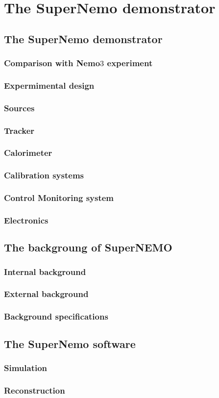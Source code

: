 \chapter{The SuperNemo demonstrator}
\label{ch:detector}

\section{The SuperNemo demonstrator}
\subsection{Comparison with Nemo$3$ experiment}
\subsection{Expermimental design}
\subsection{Sources}
\subsection{Tracker}
\subsection{Calorimeter}
\label{sec:calorimeter}
\subsection{Calibration systems}
\subsection{Control Monitoring system}
\subsection{Electronics}

\section{The backgroung of SuperNEMO}
\label{sec:SNbkg}
\subsection{Internal background}
\subsection{External background}
\subsection{Background specifications}

\section{The SuperNemo software}
\label{sec:SNsoftware}
\subsection{Simulation}
\subsection{Reconstruction}
